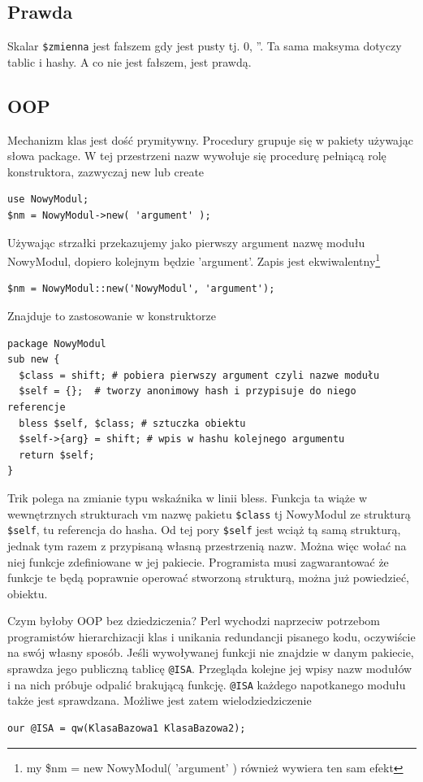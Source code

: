 \documentclass[a4paper,12pt]{article}
\begin{document}
\subsection{Prawda}
Skalar \verb|$zmienna| jest fałszem gdy jest pusty tj. 0, ''. Ta sama maksyma dotyczy tablic i hashy. A co nie jest fałszem, jest prawdą.
\subsection{OOP}
Mechanizm klas jest dość prymitywny. Procedury grupuje się w pakiety używając słowa package. W tej przestrzeni nazw wywołuje się procedurę pełniącą rolę konstruktora, zazwyczaj new lub create
\begin{verbatim}
use NowyModul;
$nm = NowyModul->new( 'argument' );
\end{verbatim}
Używając strzałki przekazujemy jako pierwszy argument nazwę modułu NowyModul, dopiero kolejnym będzie 'argument'. Zapis jest ekwiwalentny\footnote{my \$nm = new NowyModul( 'argument' ) również wywiera ten sam efekt }
\begin{verbatim}
$nm = NowyModul::new('NowyModul', 'argument');
\end{verbatim}
Znajduje to zastosowanie w konstruktorze
\begin{verbatim}
package NowyModul
sub new {
  $class = shift; # pobiera pierwszy argument czyli nazwe modułu
  $self = {};  # tworzy anonimowy hash i przypisuje do niego referencje
  bless $self, $class; # sztuczka obiektu
  $self->{arg} = shift; # wpis w hashu kolejnego argumentu
  return $self;
}
\end{verbatim}
Trik polega na zmianie typu wskaźnika w linii bless. Funkcja ta wiąże w wewnętrznych strukturach vm nazwę pakietu \verb|$class| tj NowyModul ze strukturą \verb|$self|, tu referencja do hasha. Od tej pory  \verb|$self| jest wciąż tą samą strukturą, jednak tym razem z przypisaną własną przestrzenią nazw. Można więc wołać na niej funkcje zdefiniowane w jej pakiecie. Programista musi zagwarantować że funkcje te będą poprawnie operować stworzoną strukturą, można już powiedzieć, obiektu.

Czym byłoby OOP bez dziedziczenia? Perl wychodzi naprzeciw potrzebom programistów hierarchizacji klas i unikania redundancji pisanego kodu, oczywiście na swój własny sposób. Jeśli wywoływanej funkcji nie znajdzie w danym pakiecie, sprawdza jego publiczną tablicę \verb|@ISA|. Przegląda kolejne jej wpisy nazw modułów i na nich próbuje odpalić brakującą funkcję. \verb|@ISA| każdego napotkanego modułu także jest sprawdzana. Możliwe jest zatem wielodziedziczenie
\begin{verbatim}
our @ISA = qw(KlasaBazowa1 KlasaBazowa2);
\end{verbatim}
\end{document}
